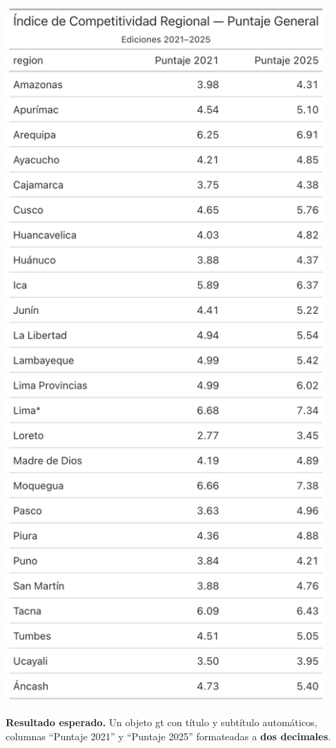 \documentclass[
  11pt,
  letterpaper,
  DIV=11,
  numbers=noendperiod]{scrartcl}
\begin{document}
\begin{center}
\includegraphics[width=0.9\textwidth,height=\textheight]{tabl1.png}
\end{center}

\textbf{Resultado esperado.} Un objeto gt con título y subtítulo
automáticos, columnas ``Puntaje 2021'' y ``Puntaje 2025'' formateadas a
\textbf{dos decimales}.
\end{document}
